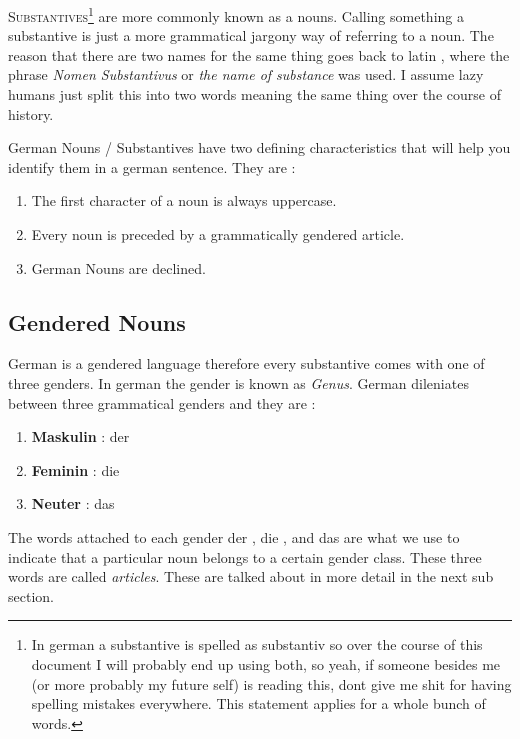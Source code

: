\documentclass[a4paper,twocolumn,10pt]{article}
\newcommand{\newpar}
{\par \vspace{0.3cm}}
\newcommand{\tcolorboxend}
{\justifying \linenumbers \vspace{0.2cm}}
\begin{document}
\tcolorboxend


\lettrine[lines=3, findent=3pt, nindent=0pt]{S}{ubstantives}\footnote{In german
	a substantive is spelled as substantiv so over the course of this document I
	will probably end up using both, so yeah, if someone besides me (or more
	probably my future self) is reading this, dont give me shit for having
	spelling mistakes everywhere. This statement applies for a whole bunch of
	words.} are more commonly known as a nouns. Calling something a substantive
is just a more grammatical jargony way of referring to a noun. The reason that
there are two names for the same thing goes back to latin , where the phrase
\textit{Nomen Substantivus} or \textit{the name of substance} was used. I assume
lazy humans just split this into two words meaning the same thing over the
course of history.\newpar

German Nouns / Substantives have two defining characteristics that will help you
identify them in a german sentence. They are :

\begin{enumerate}[noitemsep]
	\item The first character of a noun is always uppercase.
	\item Every noun is preceded by a grammatically gendered article.
	\item German Nouns are declined.
\end{enumerate}

\subsection{Gendered Nouns}
\label{ssec:gendered_nouns}

German is a gendered language therefore every substantive comes with one of
three genders. In german the gender is known as \textit{Genus}. German
dileniates between three grammatical genders and they are :

\nolinenumbers
\begin{enumerate}[noitemsep]
	\item \textbf{Maskulin }: der
	\item \textbf{Feminin} : die
	\item \textbf{Neuter}  : das
\end{enumerate}
\linenumbers

The words attached to each gender der , die , and das are what we use to
indicate that a particular noun belongs to a certain gender class. These three
words are called \textit{articles}. These are talked about in more detail in the
next sub section.\newpar
\end{document}
